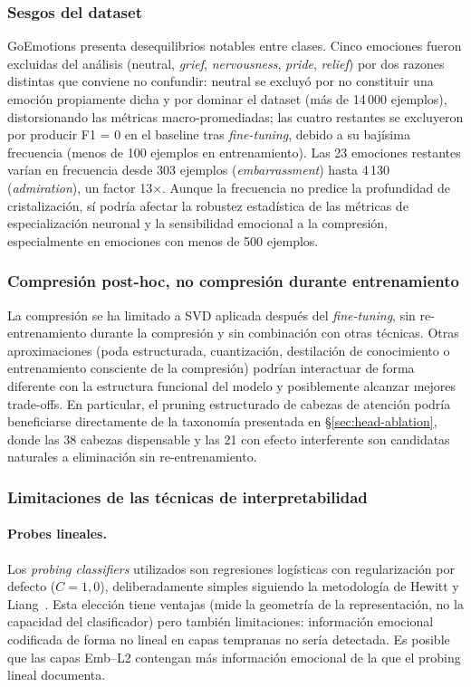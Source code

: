 \subsubsection{Sesgos del dataset}

GoEmotions presenta desequilibrios notables entre clases. Cinco emociones
fueron excluidas del análisis (neutral, \emph{grief},
\emph{nervousness}, \emph{pride}, \emph{relief}) por dos razones distintas
que conviene no confundir: neutral se excluyó por no constituir una
emoción propiamente dicha y por dominar el dataset (más de 14\,000 ejemplos),
distorsionando las métricas macro-promediadas; las cuatro restantes se
excluyeron por producir F1 = 0 en el baseline tras \emph{fine-tuning}, debido a su
bajísima frecuencia (menos de 100 ejemplos en entrenamiento). Las 23
emociones restantes varían en frecuencia desde 303 ejemplos
(\emph{embarrassment}) hasta 4\,130 (\emph{admiration}), un factor 13$\times$.
Aunque la frecuencia no predice la profundidad de cristalización, sí podría
afectar la robustez estadística de las métricas de especialización neuronal y
la sensibilidad emocional a la compresión, especialmente en emociones con
menos de 500 ejemplos.

\subsubsection{Compresión post-hoc, no compresión durante entrenamiento}

La compresión se ha limitado a SVD aplicada después del \emph{fine-tuning}, sin
re-entrenamiento durante la compresión y sin combinación con otras técnicas.
Otras aproximaciones (poda estructurada, cuantización, destilación de
conocimiento o entrenamiento consciente de la compresión) podrían interactuar de forma diferente con
la estructura funcional del modelo y posiblemente alcanzar mejores
trade-offs. En particular, el pruning estructurado de cabezas de atención
podría beneficiarse directamente de la taxonomía presentada en
\S\ref{sec:head-ablation}, donde las 38 cabezas dispensable y las 21
con efecto interferente son candidatas naturales a eliminación sin
re-entrenamiento.

\subsubsection{Limitaciones de las técnicas de interpretabilidad}

\paragraph{Probes lineales.} Los \textit{probing classifiers} utilizados son
regresiones logísticas con regularización por defecto ($C = 1{,}0$),
deliberadamente simples siguiendo la metodología de Hewitt y
Liang~\cite{hewitt2019designing}. Esta elección tiene ventajas (mide la
geometría de la representación, no la capacidad del clasificador) pero
también limitaciones: información emocional codificada de forma no lineal en
capas tempranas no sería detectada. Es posible que las capas Emb--L2
contengan más información emocional de la que el probing lineal documenta.

